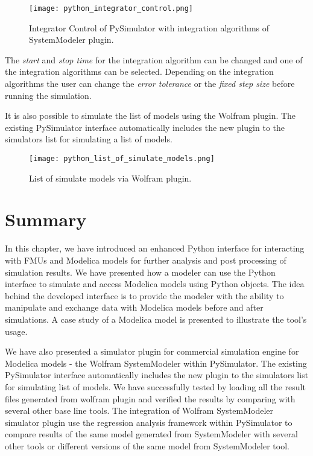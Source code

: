 \begin{figure}
	\texttt{[image: python\_integrator\_control.png]}
	\caption{Integrator Control of PySimulator with integration algorithms of SystemModeler plugin.}
	\label{fig:pythonintegratorcontrol}
\end{figure}

The \textit{start} and \textit{stop time} for the integration algorithm can be changed and one of the integration algorithms
can be selected. Depending on the integration algorithms the user can change the \textit{error tolerance} or the \textit{fixed step size}
before running the simulation.

It is also possible to simulate the list of models using the Wolfram plugin. The existing PySimulator interface automatically 
includes the new plugin to the simulators list for simulating a list of models.

\begin{landscape}
\begin{figure}
	\texttt{[image: python\_list\_of\_simulate\_models.png]}
	\caption{List of simulate models via Wolfram plugin.}
	\label{fig:pythonlistofsimulatemodels}
\end{figure}
\end{landscape}

\section{Summary}
\label{sec:pythonsummary}

In this chapter, we have introduced an enhanced Python interface for interacting with FMUs and Modelica models for further analysis and post processing of simulation results. We have presented how a modeler can use the Python interface to simulate and access Modelica models using Python objects. The idea behind the developed interface is to provide the modeler with the ability to manipulate and exchange data with Modelica models before and after simulations. A case study of a Modelica model is presented to illustrate the tool’s usage.

We have also presented a simulator plugin for commercial simulation engine for Modelica models - the Wolfram SystemModeler within PySimulator. The existing PySimulator interface automatically includes the new plugin to the simulators list for simulating list of models. We have successfully tested by loading all the result files generated from wolfram plugin and verified the results by comparing with several other base line tools. The integration of Wolfram SystemModeler simulator plugin use the regression analysis framework within PySimulator to compare results of the same model generated from SystemModeler with several other tools or different versions of the same model from SystemModeler tool.

